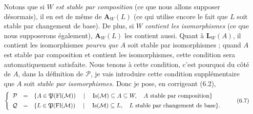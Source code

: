 Notons que si $W$ \textit{est stable par composition} (ce que nous allons supposer désormais), il en est de même de $\mathbf{A}_W(L)$ (ce qui utilise encore le fait que $L$ soit stable par changement de base). De plus, si $W$ \textit{contient les isomorphismes} (ce que nous supposerons également), $\mathbf{A}_W(L)$ les contient aussi. Quant à $\mathbf{L}_W(A)$, il contient les isomorphismes \textit{pourvu que} $A$ soit stable par isomorphismes ; quand $A$ est stable par composition et contient les isomorphismes, cette condition sera automatiquement satisfaite. Nous tenons à cette condition, c'est pourquoi du côté de $A$, dans la définition de $\mathcal{P}$, je vais introduire cette condition supplémentaire que $A$ soit \textit{stable par isomorphismes.} Donc je pose, en corrigeant (6.2),
\[
\left\{
\begin{array}{rcl}
\mathcal{P} & = & \{A\in\Pf(\Fl(\mathcal{M}))\quad\mid\quad\mathrm{Is}(\mathcal{M})\subseteq A\subseteq W,\quad A\text{ stable par composition}\}\\[1ex]
\mathcal{Q} & = & \{L\in\Pf(\Fl(\mathcal{M}))\quad\mid\quad\mathrm{Is}(\mathcal{M})\subseteq L,\quad L\text{ stable par changement de base}\}.
\end{array}
\right.
\tag*{(6.7)}
\]

